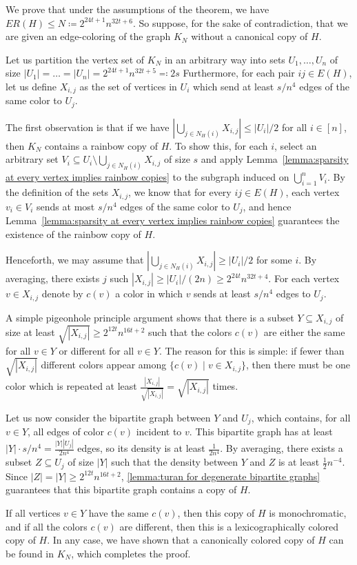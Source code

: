 \documentclass[a4paper,11pt]{article}
\makeatletter
\renewenvironment{proof}[1][\proofname] {\par\pushQED{\qed}\normalfont\topsep6\p@\@plus6\p@\relax\trivlist\item[\hskip\labelsep\bfseries#1\@addpunct{.}]\ignorespaces}{\popQED\endtrivlist\@endpefalse}
\theoremstyle{definition}
\makeatother
\begin{document}
\begin{proof}[Proof of \cref{thm:upper bound bipartite}]
We prove that under the assumptions of the theorem, we have $ER(H)\leq N \coloneqq 2^{24t+1}n^{32t+6}$. So suppose, for the sake of contradiction, that we are given an edge-coloring of the graph $K_N$ without a canonical copy of $H$.

Let us partition the vertex set of $K_N$ in an arbitrary way into sets $U_1, \dots, U_n$ of size $|U_1|=\dots=|U_n|=2^{24t+1}n^{32t+5}\eqqcolon 2s$
Furthermore, for each pair $ij\in E(H)$, let us define $X_{i, j}$ as the set of vertices in $U_i$ which send at least $s/n^{4}$ edges of the same color to $U_j$. 

The first observation is that if we have $|\bigcup_{j \in N_H(i)}X_{i, j}|\leq |U_i|/2$ for all $i\in [n]$, then $K_N$ contains a rainbow copy of $H$. To show this, for each $i$, select an arbitrary set $V_i\subseteq U_i\setminus \bigcup_{j \in N_H(i)}X_{i, j}$ of size $s$ and apply Lemma~\ref{lemma:sparsity at every vertex implies rainbow copies} to the subgraph induced on $\bigcup_{i=1}^n V_i$. By the definition of the sets $X_{i, j}$, we know that for every $ij\in E(H)$, each vertex $v_i\in V_i$ sends at most $s/n^4$ edges of the same color to $U_j$, and hence Lemma~\ref{lemma:sparsity at every vertex implies rainbow copies} guarantees the existence of the rainbow copy of $H$.

Henceforth, we may assume that $|\bigcup_{j \in N_H(i)}X_{i, j}|\geq |U_i|/2$ for some $i$. By averaging, there exists $j$ such $|X_{i, j}| \geq |U_i|/(2n) \geq 2^{24t}n^{32t+4}$. For each vertex $v\in X_{i,j}$ denote by $c(v)$ a color in which $v$ sends at least $s/n^4$ edges to $U_j$. 

A simple pigeonhole principle argument shows that there is a subset $Y\subseteq X_{i, j}$ of size at least $\sqrt{|X_{i, j}|}\geq 2^{12t}n^{16t+2}$ such that the colors $c(v)$ are either the same for all $v\in Y$ or different for all $v\in Y$. The reason for this is simple: if fewer than $\sqrt{|X_{i, j}|}$ different colors appear among $\{c(v)\mid v\in X_{i, j}\}$, then there must be one color which is repeated at least $\frac{|X_{i, j}|}{\sqrt{|X_{i, j}|}}=\sqrt{|X_{i, j}|}$ times.

Let us now consider the bipartite graph between $Y$ and $U_j$, which contains, for all $v \in Y$, all edges of color $c(v)$ incident to $v$. This bipartite graph has at least 
$|Y|\cdot s/n^4=\frac{|Y||U_j|}{2n^4}$ edges, so its density is at least $\frac{1}{2n^4}$. By averaging, there exists a subset $Z\subseteq U_j$ of size $|Y|$ such that the density between $Y$ and $Z$ is at least $\frac 12 n^{-4}$. 
Since $|Z|=|Y|\geq 2^{12t}n^{16t+2}$, \cref{lemma:turan for degenerate bipartite graphs} guarantees that this bipartite graph contains a copy of $H$. 

If all vertices $v\in Y$ have the same $c(v)$, then this copy of $H$ is monochromatic, and if all the colors $c(v)$ are different, then this is a lexicographically colored copy of $H$. In any case, we have shown that a canonically colored copy of $H$ can be found in $K_N$, which completes the proof. 
\end{proof}
\end{document}
